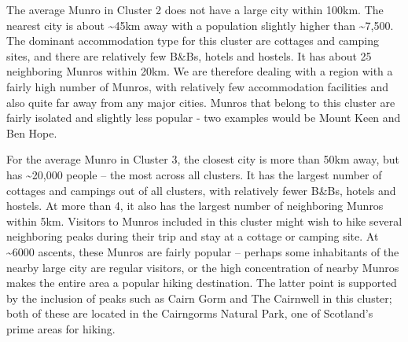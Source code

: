 \documentclass[11pt,a4paper]{article}
\begin{document}
The average Munro in Cluster 2 does not have a large city within 100km. The nearest city is about \textasciitilde 45km away with a population slightly higher than \textasciitilde 7,500. The dominant accommodation type for this cluster are cottages and camping sites, and there are relatively few B&Bs, hotels and hostels. It has about 25 neighboring Munros within 20km. We are therefore dealing with a region with a fairly high number of Munros, with relatively few accommodation facilities and also quite far away from any major cities. Munros that belong to this cluster are fairly isolated and slightly less popular - two examples would be Mount Keen and Ben Hope.

For the average Munro in Cluster 3, the closest city is more than 50km away, but has \textasciitilde 20,000 people – the most across all clusters. It has the largest number of cottages and campings out of all clusters, with relatively fewer B&Bs, hotels and hostels. At more than 4, it also has the largest number of neighboring Munros within 5km. Visitors to Munros included in this cluster might wish to hike several neighboring peaks during their trip and stay at a cottage or camping site. At \textasciitilde 6000 ascents, these Munros are fairly popular – perhaps some inhabitants of the nearby large city are regular visitors, or the high concentration of nearby Munros makes the entire area a popular hiking destination. The latter point is supported by the inclusion of peaks such as Cairn Gorm and The Cairnwell in this cluster; both of these are located in the Cairngorms Natural Park, one of Scotland's prime areas for hiking.
\end{document}
